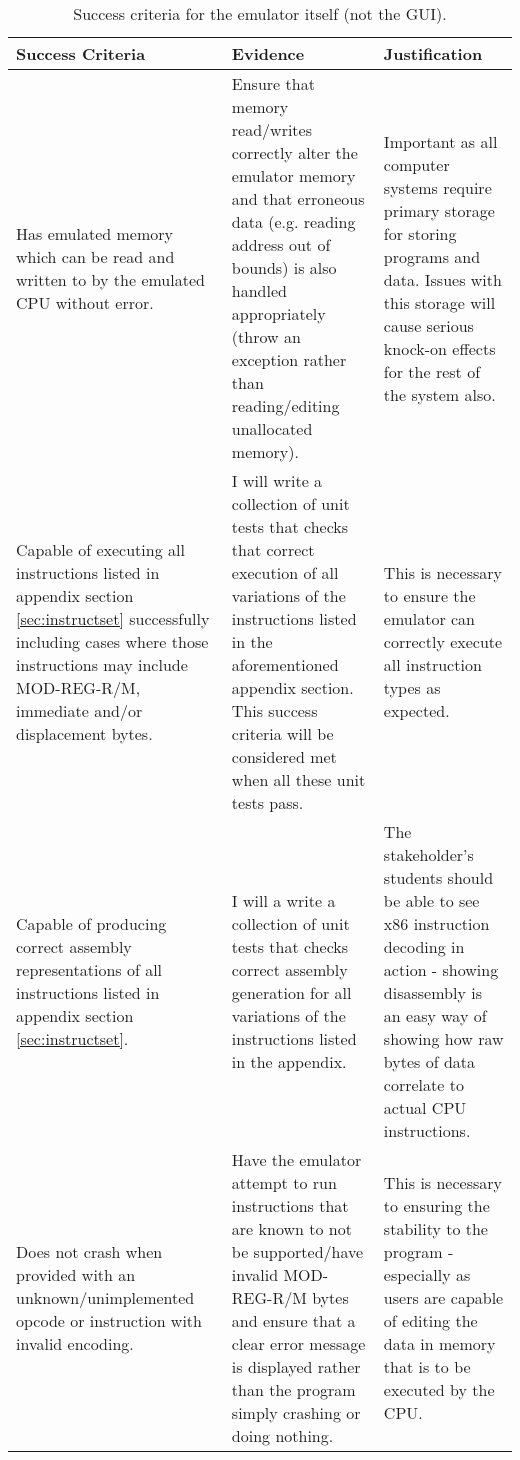         \begin{table}
            \begin{tabular} { | m{} | m{} | m{} | }
                \hline
                \textbf{Success Criteria} & \textbf{Evidence} & \textbf{Justification} \\
                \hline
                Has emulated memory which can be read and written to by the emulated CPU without error. &
                Ensure that memory read/writes correctly alter the emulator memory and that erroneous data (e.g. reading address out of bounds) is also handled appropriately (throw an exception rather than reading/editing unallocated memory). &
                Important as all computer systems require primary storage for storing programs and data. Issues with this storage will cause serious knock-on effects for the rest of the system also. \\
                \hline
                Capable of executing all instructions listed in appendix section \ref{sec:instructset} successfully including cases where those instructions may include MOD-REG-R/M, immediate and/or displacement bytes. &
                I will write a collection of unit tests that checks that correct execution of all  variations of the instructions listed in the aforementioned appendix section. This success criteria will be considered met when all these unit tests pass. &
                This is necessary to ensure the emulator can correctly execute all instruction types as expected. \\
                \hline
                Capable of producing correct assembly representations of all instructions listed in appendix section \ref{sec:instructset}. &
                I will a write a collection of unit tests that checks correct assembly generation for all variations of the instructions listed in the appendix. &
                The stakeholder's students should be able to see x86 instruction decoding in action - showing disassembly is an easy way of showing how raw bytes of data correlate to actual CPU instructions. \\
                \hline
                Does not crash when provided with an unknown/unimplemented opcode or instruction with invalid encoding. &
                Have the emulator attempt to run instructions that are known to not be supported/have invalid MOD-REG-R/M bytes and ensure that a clear error message is displayed rather than the program simply crashing or doing nothing. &
                This is necessary to ensuring the stability to the program - especially as users are capable of editing the data in memory that is to be executed by the CPU. \\
                \hline
            \end{tabular}
            \caption{Success criteria for the emulator itself (not the GUI).}
            \label{table:emulator-success-criteria}
        \end{table}
